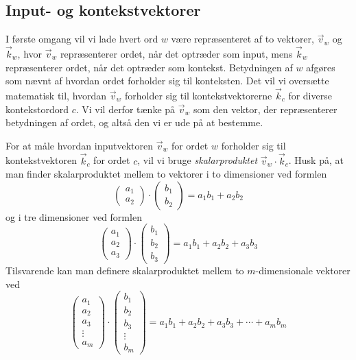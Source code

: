 \documentclass{article}
\begin{document}
\subsection*{Input- og kontekstvektorer}
I første omgang vil vi lade hvert ord $w$ være repræsenteret af to vektorer, $\overrightarrow{v}_{w}$ og $\overrightarrow{k}_{w}$, hvor $\overrightarrow{v}_{w}$ repræsenterer ordet, når det optræder som input, mens $\overrightarrow{k}_{w}$ repræsenterer ordet, når det optræder som kontekst.  Betydningen af $w$ afgøres som nævnt af hvordan ordet forholder sig til konteksten. Det vil vi oversætte matematisk til, hvordan $\overrightarrow{v}_{w}$ forholder sig til kontekstvektorerne $\overrightarrow{k}_{c}$ for diverse kontekstordord $c$. Vi vil derfor tænke på $\overrightarrow{v}_{w}$ som den vektor, der repræsenterer betydningen af ordet, og altså den vi er ude på at bestemme.

For at måle hvordan inputvektoren $\overrightarrow{v}_{w}$ for ordet $w$ forholder sig til kontekstvektoren $\overrightarrow{k}_{c}$ for ordet $c$, vil vi bruge \emph{skalarproduktet} $\overrightarrow{v}_{w}\cdot \overrightarrow{k}_{c}$.   Husk på, at man finder skalarproduktet mellem to vektorer i to dimensioner ved formlen
 $$\begin{pmatrix} a_1\\a_2\end{pmatrix}\cdot \begin{pmatrix} b_1\\b_2\end{pmatrix}=a_1b_1+a_2b_2$$ og i tre dimensioner ved formlen
$$\begin{pmatrix} a_1\\a_2\\a_3\end{pmatrix}\cdot \begin{pmatrix} b_1\\b_2\\b_3\end{pmatrix}=a_1b_1+a_2b_2+a_3b_3$$
 Tilsvarende kan man definere skalarproduktet mellem to  $m$-dimensionale vektorer ved
$$\begin{pmatrix} a_1\\a_2\\a_3\\ \vdots\\a_m\end{pmatrix}\cdot \begin{pmatrix} b_1\\b_2\\b_3\\ \vdots \\b_m\end{pmatrix}=a_1b_1+a_2b_2+a_3b_3+\dotsm + a_mb_m$$
\end{document}
